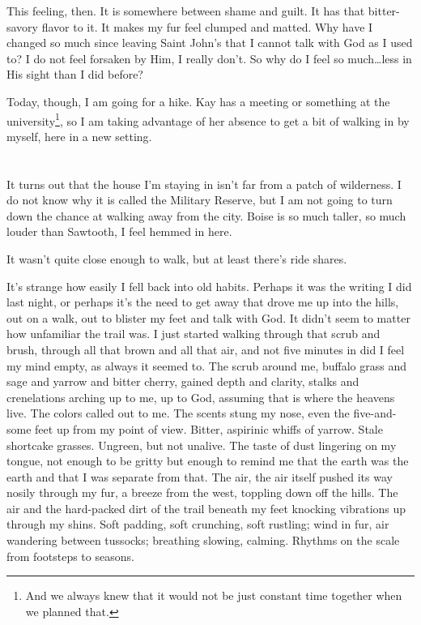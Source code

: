 This feeling, then. It is somewhere between shame and guilt. It has that bitter-savory flavor to it. It makes my fur feel clumped and matted. Why have I changed so much since leaving Saint John's that I cannot talk with God as I used to? I do not feel forsaken by Him, I really don't. So why do I feel so much\ldots less in His sight than I did before?

Today, though, I am going for a hike. Kay has a meeting or something at the university\footnote{And we always knew that it would not be just constant time together when we planned that.}, so I am taking advantage of her absence to get a bit of walking in by myself, here in a new setting.

\section{}

It turns out that the house I'm staying in isn't far from a patch of wilderness. I do not know why it is called the Military Reserve, but I am not going to turn down the chance at walking away from the city. Boise is so much taller, so much louder than Sawtooth, I feel hemmed in here.

It wasn't quite close enough to walk, but at least there's ride shares.

It's strange how easily I fell back into old habits. Perhaps it was the writing I did last night, or perhaps it's the need to get away that drove me up into the hills, out on a walk, out to blister my feet and talk with God. It didn't seem to matter how unfamiliar the trail was. I just started walking through that scrub and brush, through all that brown and all that air, and not five minutes in did I feel my mind empty, as always it seemed to. The scrub around me, buffalo grass and sage and yarrow and bitter cherry, gained depth and clarity, stalks and crenelations arching up to me, up to God, assuming that is where the heavens live. The colors called out to me. The scents stung my nose, even the five-and-some feet up from my point of view. Bitter, aspirinic whiffs of yarrow. Stale shortcake grasses. Ungreen, but not unalive. The taste of dust lingering on my tongue, not enough to be gritty but enough to remind me that the earth was the earth and that I was separate from that. The air, the air itself pushed its way nosily through my fur, a breeze from the west, toppling down off the hills. The air and the hard-packed dirt of the trail beneath my feet knocking vibrations up through my shins. Soft padding, soft crunching, soft rustling; wind in fur, air wandering between tussocks; breathing slowing, calming. Rhythms on the scale from footsteps to seasons.

